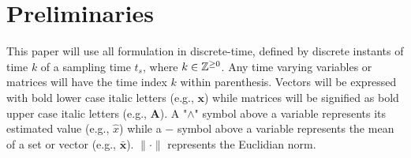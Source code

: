 
\section{Preliminaries} \label{sec:preliminaries}

This paper will use all formulation in discrete-time, defined by discrete instants of time $k$ of a sampling time $t_s$, where $k \in \mathbb{Z}^{\geq0}$. Any time varying variables or matrices will have the time index $k$ within parenthesis. Vectors will be expressed with bold lower case italic letters (e.g., $\bm{x}$) while matrices will be signified as bold upper case italic letters (e.g., $\bm{A}$). A "$\wedge$" symbol above a variable represents its estimated value (e.g., $\hat{x}$) while a $-$ symbol above a variable represents the mean of a set or vector (e.g., $\bar{\bm{x}}$). $\lVert\cdot\rVert$ represents the Euclidian norm.

